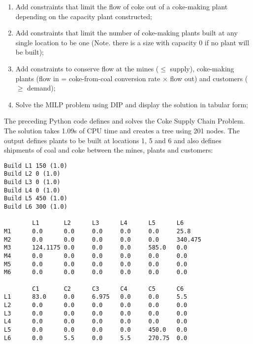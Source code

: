 \begin{enumerate}
\item Add constraints that limit the flow of coke out of a coke-making plant depending on the capacity plant constructed;


\item Add constraints that limit the number of coke-making plants built at any single location to be one (Note. there is a size with capacity 0 if no plant will be built);


\item Add constraints to conserve flow at the mines ($\leq$ supply), coke-making plants (flow in = coke-from-coal conversion rate $\times$ flow out) and customers ($\geq$ demand);


\item Solve the \ac{MILP} problem using \ac{DIP} and display the solution in tabular form;

\end{enumerate}

The preceding Python code defines and solves the Coke Supply Chain Problem. The solution takes 1.09s of CPU time and creates a tree using 201 nodes. The output defines plants to be built at locations 1, 5 and 6 and also defines shipments of coal and coke between the mines, plants and customers:
\begin{verbatim}
Build L1 150 (1.0)
Build L2 0 (1.0)
Build L3 0 (1.0)
Build L4 0 (1.0)
Build L5 450 (1.0)
Build L6 300 (1.0)

        L1       L2      L3      L4      L5      L6
M1      0.0      0.0     0.0     0.0     0.0     25.8
M2      0.0      0.0     0.0     0.0     0.0     340.475
M3      124.1175 0.0     0.0     0.0     585.0   0.0
M4      0.0      0.0     0.0     0.0     0.0     0.0
M5      0.0      0.0     0.0     0.0     0.0     0.0
M6      0.0      0.0     0.0     0.0     0.0     0.0

        C1       C2      C3      C4      C5      C6
L1      83.0     0.0     6.975   0.0     0.0     5.5
L2      0.0      0.0     0.0     0.0     0.0     0.0
L3      0.0      0.0     0.0     0.0     0.0     0.0
L4      0.0      0.0     0.0     0.0     0.0     0.0
L5      0.0      0.0     0.0     0.0     450.0   0.0
L6      0.0      5.5     0.0     5.5     270.75  0.0
\end{verbatim}
